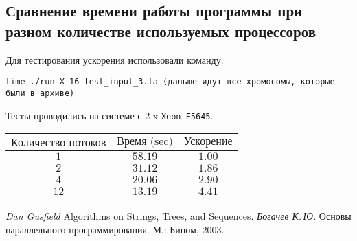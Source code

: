 \documentclass[12pt,a4paper]{article}
\begin{document}
\subsection{Сравнение времени работы программы при разном количестве используемых процессоров}
Для тестирования ускорения использовали команду:
\\
\begin{verbatim}
time ./run X 16 test_input_3.fa (дальше идут все хромосомы, которые были в архиве)
\end{verbatim}
Тесты проводились на системе с 2 x \texttt{Xeon E5645}.
\\
\begin{tabular}{|c|c|c|}
\hline 
$\text{Количество потоков}$ & $\text{Время (sec)}$ & $\text{Ускорение} $ \\ 
\hline 
$1$ & $58.19$ &  $1.00$ \\ 
\hline 
$2$ & $31.12$  &  $1.86$ \\ 
\hline 
$4$ & $20.06$  &  $2.90$ \\ 
\hline 
$12$ & $13.19$ & $4.41$ \\ 
\hline
\end{tabular}

\begin{thebibliography}{99}
\textit{Dan Gusfield} Algorithms on Strings, Trees, and Sequences.
\textit{Богачев К.\,Ю. } Основы параллельного программирования. М.: Бином, 2003.
\end{thebibliography}
\end{document}
